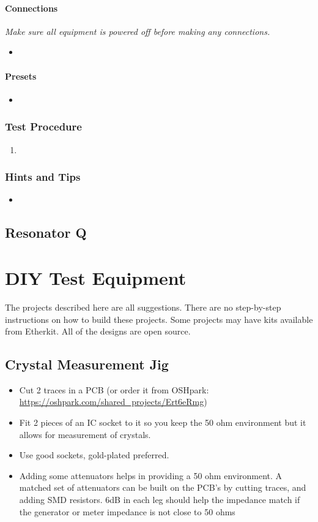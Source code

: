 \documentclass[10pt,letterpaper]{book}
\begin{document}
\subsubsection*{Connections}
\emph{Make sure all equipment is powered off before making any connections.}
\begin{itemize}
	\item
\end{itemize}
\subsubsection*{Presets}
\begin{itemize}
	\item
\end{itemize}
\subsection*{Test Procedure}
\begin{enumerate}
	\item  
\end{enumerate}

\subsection*{Hints and Tips}
\begin{itemize}
	\item
\end{itemize}


\section{Resonator Q}
\chapter{DIY Test Equipment}
The projects described here are all suggestions. There are no step-by-step instructions on how to build these projects. Some projects may have kits available from Etherkit. All of the designs are open source.
\section{Crystal Measurement Jig}
\begin{itemize}
	\item Cut 2 traces in a PCB (or order it from OSHpark: \url{https://oshpark.com/shared_projects/Ert6eRmg})
	\item  Fit 2 pieces of an IC socket to it so you keep the 50 ohm environment but it allows for measurement of crystals.
	\item Use good sockets, gold-plated preferred.  
	\item Adding some attenuators helps in providing a 50 ohm environment. A matched set of attenuators can be built on the PCB's by cutting traces, and adding SMD resistors. 6dB in each leg should help the impedance match if the generator or meter impedance is not close to 50 ohms
\end{itemize}
\end{document}
